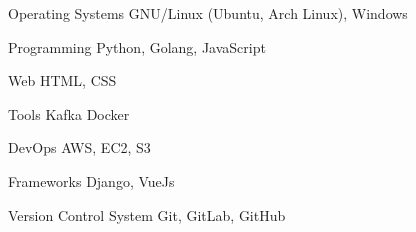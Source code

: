 

\begin{cvskills}

  \cvskill
    {Operating Systems} %
    {GNU/Linux (Ubuntu, Arch Linux), Windows } %

  \cvskill
    {Programming} %
    {Python, Golang, JavaScript} %

  \cvskill
    {Web} %
    {HTML, CSS} %

  \cvskill
    {Tools} %
    {Kafka} %
    {Docker} %


\cvskill
{DevOps} %
{AWS, EC2, S3} %


  \cvskill
    {Frameworks} %
    {Django, VueJs} %


  \cvskill
    {Version Control System} %
    {Git, GitLab, GitHub} %


\end{cvskills}

